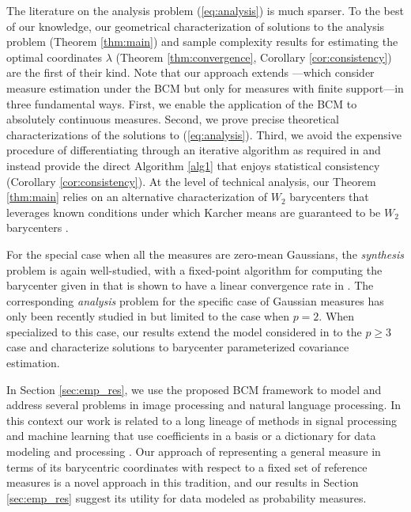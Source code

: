 \documentclass[nohyperref]{article}
\theoremstyle{definition}
\begin{document}
The literature on the analysis problem (\ref{eq:analysis}) is much sparser.  To the best of our knowledge, our geometrical characterization of solutions to the analysis problem (Theorem \ref{thm:main}) and sample complexity results for estimating the optimal coordinates $\lambda$ (Theorem \ref{thm:convergence}, Corollary \ref{cor:consistency}) are the first of their kind.  Note that our approach extends \citep{bonneel2016coordinates, schmitz2018wasserstein}---which consider measure estimation under the BCM but only for measures with finite support---in three fundamental ways.  First, we enable the application of the BCM to absolutely continuous measures.  Second, we prove precise theoretical characterizations of the solutions to (\ref{eq:analysis}).  Third, we avoid the expensive procedure of differentiating through an iterative algorithm as required in \citep{bonneel2016coordinates} and instead provide the direct Algorithm \ref{alg1} that enjoys statistical consistency (Corollary \ref{cor:consistency}).  At the level of technical analysis, our Theorem \ref{thm:main} relies on an alternative characterization of $W_{2}$ barycenters that leverages known conditions under which Karcher means are guaranteed to be $W_{2}$ barycenters  \citep{panaretos2020invitation}.  

For the special case when all the measures are zero-mean Gaussians, the \emph{synthesis} problem is again well-studied, with a fixed-point algorithm for computing the barycenter given in \citep{alvarez2016fixed} that is shown to have a linear convergence rate in \citep{chewi2020gradient, altschuler2021averaging}.  The corresponding \emph{analysis} problem for the specific case of Gaussian measures has only been recently studied in \cite{musolas2021geodesically} but limited to the case when $p=2$. When specialized to this case, our results extend the model considered in \cite{musolas2021geodesically} to the $p \geq 3$ case and characterize solutions to barycenter parameterized covariance estimation.

In Section \ref{sec:emp_res}, we use the proposed BCM framework to model and address several problems in image processing and natural language processing. In this context our work is related to a long lineage of methods in signal processing and machine learning that use coefficients in a basis or a dictionary for data modeling and processing \citep{mallat1999wavelet, donoho2006compressed, tovsic2011dictionary}.  Our approach of representing a general measure in terms of its barycentric coordinates with respect to a fixed set of reference measures is a novel approach in this tradition, and our results in Section \ref{sec:emp_res} suggest its utility for data modeled as probability measures.
\end{document}
